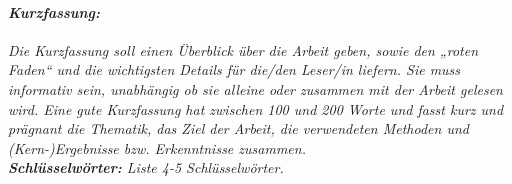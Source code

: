 \documentclass[../Paper/Paper.tex]{subfiles}
\begin{document}
%
%
\paragraph{\textit{Kurzfassung:}}\textit{%
	Die Kurzfassung soll einen Überblick über die Arbeit geben, sowie den „roten Faden“ und die wichtigsten Details für die/den Leser/in liefern. Sie muss informativ sein, unabhängig ob sie alleine oder zusammen mit der Arbeit gelesen wird. Eine gute Kurzfassung hat zwischen 100 und 200 Worte und fasst kurz und prägnant die Thematik, das Ziel der Arbeit, die verwendeten Methoden und (Kern-)Ergebnisse bzw. Erkenntnisse zusammen.\\
	\textbf{\textit{Schlüsselwörter:}} Liste 4-5 Schlüsselwörter.
}\raggedbottom
%
\end{document}
